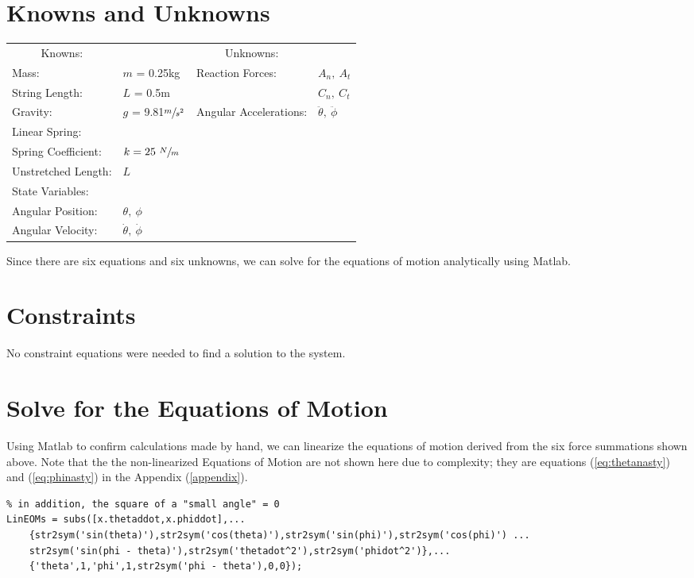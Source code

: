 \documentclass[12pt]{report}
\begin{document}
\begin{flushleft}
\section{Knowns and Unknowns} \label{knownsandunknowns}
\begin{tabular}{ll@{\hskip .75in}ll}
  \multicolumn{1}{c}{Knowns:} && \multicolumn{1}{c}{Unknowns:} \\
  Mass: &$m$ = 0.25kg & Reaction Forces: & $A_n,~A_t$ \\
  String Length: &$L$ = 0.5m & & $C_n,~C_t$\\
  Gravity: &$g$ = 9.81$\sfrac{m}{s^2}$& Angular Accelerations: & $\ddot{\theta},~\ddot{\phi}$ \\
  Linear Spring: \\
  \quad Spring Coefficient:& $k = 25~\sfrac{N}{m}$\\
  \quad Unstretched Length:& $L$ \\
  State Variables: \\
  \quad Angular Position: &$\theta,~\phi$ & \\
  \quad Angular Velocity: &$\dot{\theta},~\dot{\phi}$ & \\
\end{tabular}
\vspace{2ex}

Since there are six equations and six unknowns, we can solve for the equations of
motion analytically using Matlab.

\section{Constraints}
No constraint equations were needed to find a solution to the system.
\section{Solve for the Equations of Motion}
Using Matlab to confirm calculations made by hand, we can linearize the equations
of motion derived from the six force summations shown above.
Note that the the non-linearized Equations of Motion are not shown here due to
complexity; they are equations (\ref{eq:thetanasty}) and (\ref{eq:phinasty})
in the Appendix (\ref{appendix}).
\begin{lstlisting}[frame=lines,style=Matlab-editor,basicstyle = \mlttfamily]
% Substituting the respective angle for sin terms and 1 for cosine,
% in addition, the square of a "small angle" = 0
LinEOMs = subs([x.thetaddot,x.phiddot],...
    {str2sym('sin(theta)'),str2sym('cos(theta)'),str2sym('sin(phi)'),str2sym('cos(phi)') ...
    str2sym('sin(phi - theta)'),str2sym('thetadot^2'),str2sym('phidot^2')},...
    {'theta',1,'phi',1,str2sym('phi - theta'),0,0});


\end{lstlisting}
\end{flushleft}
\end{document}

